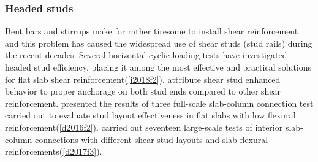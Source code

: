\subsubsection{Headed studs}
Bent bars and stirrups make for rather tiresome to install shear reinforcement and this problem has caused the widespread use of shear studs (stud rails) during the recent decades. Several horizontal cyclic loading tests \cite{dilger1994,robertson2002,brown2003,broms2007ductility,tan2005interior,kang2008,hong2007lattice,matzke2015behavior,isufi2018} have investigated headed stud efficiency, placing it among the most effective and practical solutions for flat slab shear reinforcement(\ref{i2018f2}). \cite{ghali2005,hueste2007} attribute shear stud enhanced behavior to proper anchorage on both stud ends compared to other shear reinforcement. \cite{dam2016} presented the results of three full-scale slab-column connection test carried out to evaluate stud layout effectiveness in flat slabs with low flexural reinforcement(\ref{d2016f2}). \cite{dam2017punching} carried out seventeen large-scale tests of interior slab-column connections with different shear stud layouts and slab flexural reinforcements(\ref{d2017f3}).
